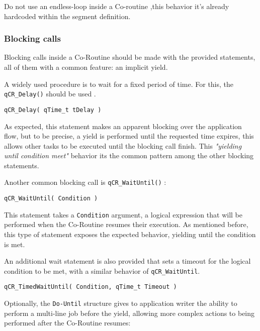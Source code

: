 \begin{tcolorbox}
\HandRight Do not use an endless-loop inside a Co-routine ,this behavior it's already hardcoded within the segment definition.
\end{tcolorbox}

\subsubsection{Blocking calls}
Blocking calls inside a Co-Routine should be made with the provided statements, all of them with a common feature: an implicit yield.

A widely used procedure is to wait for a fixed period of time. For this, the \lstinline{qCR_Delay()} should be used . 
\medskip


\begin{lstlisting}[style=CStyle]
qCR_Delay( qTime_t tDelay ) 
\end{lstlisting}

As expected, this statement makes an apparent blocking over the application flow, but to be precise, a yield is performed until the requested time expires, this allows other tasks to be executed until the blocking call finish. This \textit{"yielding until condition meet"} behavior its the common pattern among the other blocking statements.
\medskip

Another common blocking call is \lstinline{qCR_WaitUntil()} :

\begin{lstlisting}[style=CStyle]
qCR_WaitUntil( Condition ) 
\end{lstlisting}

This statement takes a \lstinline{Condition} argument, a logical expression that will be performed when the Co-Routine resumes their execution. As mentioned before, this type of statement exposes the expected behavior, yielding until the condition is met.
\medskip

An additional wait statement is also provided that sets a timeout for the logical condition to be met, with a similar behavior of \lstinline{qCR_WaitUntil}. 
\medskip

\begin{lstlisting}[style=CStyle]
qCR_TimedWaitUntil( Condition, qTime_t Timeout )
\end{lstlisting}

Optionally, the \lstinline{Do-Until}   structure gives to application writer the ability to perform a multi-line job before the yield, allowing more complex actions to being performed after the Co-Routine resumes: 
\medskip

